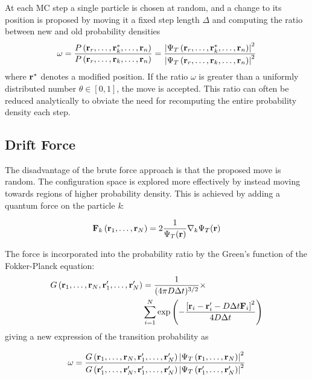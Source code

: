 At each MC step a single particle is chosen at random, and a change to its
position is proposed by moving it a fixed step length \(\Delta\) and computing the
ratio between new and old probability densities
\begin{align*}
  \omega = \frac{P\left( \vb{r}_{r}, \ldots, \vb{r}_{k}^{*}, \ldots, \vb{r}_{n} \right)}{P\left( \vb{r}_{r}, \ldots, \vb{r}_{k}, \ldots, \vb{r}_{n} \right)}
  =  \frac{\left| \Psi_{T}\left( \vb{r}_{r}, \ldots, \vb{r}_{k}^{*}, \ldots, \vb{r}_{n} \right)\right|^{2}}{\left| \Psi_{T}\left( \vb{r}_{r}, \ldots, \vb{r}_{k}, \ldots, \vb{r}_{n} \right)\right|^{2}}
\end{align*}
where \(\vb{r}^{*}\) denotes a modified position.
If the ratio \(\omega\) is greater
than a
uniformly distributed number \(\theta \in [0, 1]\), the move is accepted.
This ratio can often be reduced analytically to obviate the need for recomputing
the entire probability density each step.

\subsection{Drift Force}
The disadvantage of the brute force approach is that the proposed move is random.
The configuration space is explored more effectively by instead moving towards
regions of higher probability density. This is achieved
by adding a quantum force on the particle \textit{k}:

\begin{align*}
  \vb{F}_{k}\left( \vb{r}_{1}, \ldots, \vb{r}_{N} \right) = 2 \frac{1}{\Psi_T(\vb{r})}\nabla_{k}\Psi_T(\vb{r})
\end{align*}

The force is incorporated into the probability ratio by the Green's function of
the Fokker-Planck equation:
\begin{align*}
  G\left( \vb{r}_{1},\ldots,\vb{r}_{N},\vb{r}^{\prime}_{1},\ldots,\vb{r}^{\prime}_{N} \right)
  &= \frac{1}{(4\pi D\Delta t)^{3/2}}\times\\
  &\sum_{i=1}^{N}\exp\left( -\frac{\left[\vb{r}_{i}-\vb{r}^{\prime}_{i}-D\Delta t \vb{F}_{i}\right]^{2}}{4D\Delta t} \right)
\end{align*}
giving a new expression of the transition probability as

\begin{align*}
  \omega = \frac{G\left(  \vb{r}_{1},\ldots,\vb{r}_{N},\vb{r}^{\prime}_{1},\ldots,\vb{r}^{\prime}_{N} \right)\left|\Psi_{T}\left( \vb{r}_{1},\ldots,\vb{r}_{N} \right)\right|^{2}}{G\left(  \vb{r}_{1}^{\prime},\ldots,\vb{r}_{N}^{\prime},\vb{r}^{\prime}_{1},\ldots,\vb{r}^{\prime}_{N} \right)\left|\Psi_{T}\left( \vb{r}_{1}^{\prime},\ldots,\vb{r}_{N}^{\prime} \right)\right|^{2}}
\end{align*}

